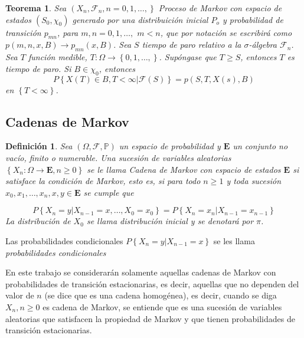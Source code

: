 \documentclass{article}
\newtheorem{Def}{Definición}[section]
\newtheorem{Teo}{Teorema}[section]
\newcommand{\prob}{\mathbb{P}}
\numberwithin{equation}{section}
\begin{document}
\begin{Teo}
Sea $\left(X_{n},\mathcal{F}_{n},n=0,1,\ldots,\right\}$ Proceso de Markov con espacio de estados $\left(S_{0},\chi_{0}\right)$ generado por una distribuici\'on inicial $P_{o}$ y probabilidad de transici\'on $p_{mn}$, para $m,n=0,1,\ldots,$ $m<n$, que por notaci\'on se escribir\'a como $p\left(m,n,x,B\right)\rightarrow p_{mn}\left(x,B\right)$. Sea $S$ tiempo de paro relativo a la $\sigma$-\'algebra $\mathcal{F}_{n}$. Sea $T$ funci\'on medible, $T:\Omega\rightarrow\left\{0,1,\ldots,\right\}$. Sup\'ongase que $T\geq S$, entonces $T$ es tiempo de paro. Si $B\in\chi_{0}$,
entonces
\begin{equation}\label{Prop.Fuerte.Markov}
P\left\{X\left(T\right)\in B,T<\infty|\mathcal{F}\left(S\right)\right\} = p\left(S,T,X\left(s\right),B\right)
\end{equation}
en $\left\{T<\infty\right\}$.
\end{Teo}

\subsection*{Cadenas de Markov}

\begin{Def}
Sea $\left(\Omega,\mathcal{F},\prob\right)$ un espacio de probabilidad y $\mathbf{E}$ un conjunto no vac\'io, finito o numerable. Una sucesi\'on de variables aleatorias $\left\{X_{n}:\Omega\rightarrow\mathbf{E},n\geq0\right\}$ se le llama \textit{Cadena de Markov} con espacio de estados $\mathbf{E}$ si satisface la condici\'on de Markov, esto es, si para todo $n\geq1$ y toda sucesi\'on $x_{0},x_{1},\ldots,x_{n},x,y\in\mathbf{E}$ se cumple que 

\begin{equation}
P\left\{X_{n}=y|X_{n-1}=x,\ldots,X_{0}=x_{0}\right\}=P\left\{X_{n}=x_{n}|X_{n-1}=x_{n-1}\right\}
\end{equation}
La distribuci\'on de $X_{0}$ se llama distribuci\'on inicial y se denotar\'a por $\pi$.
\end{Def}

Las probabilidades condicionales $P\left\{X_{n}=y|X_{n-1}=x\right\}$ se les llama \textit{probabilidades condicionales}


En este trabajo se considerar\'an solamente aquellas cadenas de Markov con probabilidades de transici\'on estacionarias, es decir, aquellas que no dependen del valor de $n$ (se dice que es una cadena homog\'enea), es decir, cuando se diga $X_{n},n\geq0$ es cadena de Markov, se entiende que es una sucesi\'on de variables aleatorias que satisfacen la propiedad de Markov y que tienen probabilidades de transici\'on estacionarias.
\end{document}
